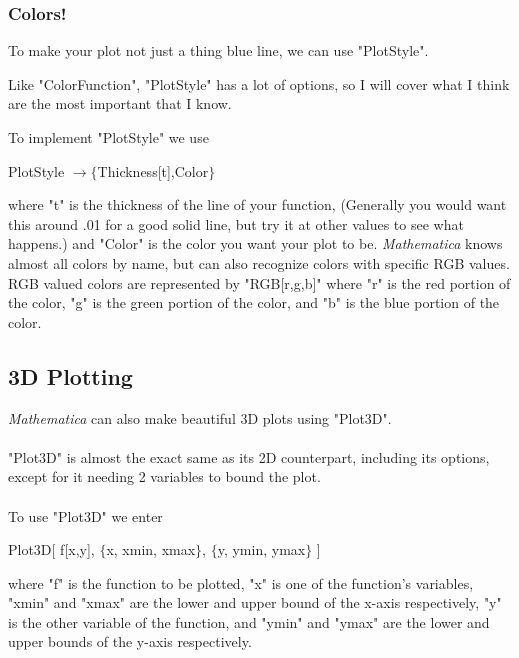 \documentclass[11pt,a4paper,twoside]{article}
\begin{document}
				\subsubsection{Colors!}
						
					To make your plot not just a thing blue line, we can use "PlotStyle".
						
					Like "ColorFunction", "PlotStyle" has a lot of options, so I will cover what I think are the most important that I know.
						
					To implement "PlotStyle" we use
						
					\begin{center} PlotStyle $ \rightarrow \{ $Thickness[t],Color$ \} $ \end{center}
						
					where "t" is the thickness of the line of your function, (Generally you would want this around .01 for a good solid line, but try it at other values to see what happens.) and "Color" is the color you want your plot to be.  \textit{Mathematica} knows almost all colors by name, but can also recognize colors with specific RGB values.  RGB valued colors are represented by "RGB[r,g,b]" where "r" is the red portion of the color, "g" is the green portion of the color, and "b" is the blue portion of the color.
				
			\subsection{3D Plotting}
			
				\textit{Mathematica} can also make beautiful 3D plots using "Plot3D".
				\\
				\\
				"Plot3D" is almost the exact same as its 2D counterpart, including its options, except for it needing 2 variables to bound the plot.
				\\
				\\
				To use "Plot3D" we enter
				
				\begin{center}
				
					Plot3D[ f[x,y], $\{$x, xmin, xmax$\}$, $\{$y, ymin, ymax$\}$ ]
				
				\end{center}
				
				where "f" is the function to be plotted, "x" is one of the function's variables, "xmin" and "xmax" are the lower and upper bound of the x-axis respectively, "y" is the other variable of the function, and "ymin" and "ymax" are the lower and upper bounds of the y-axis respectively.
		
\end{document}
